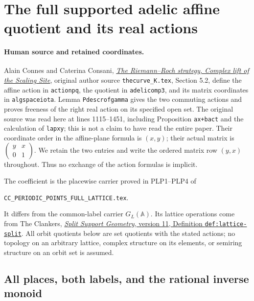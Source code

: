 \section{The full supported adelic affine quotient and its real actions}
\label{sec:supported-complex-lift}

\paragraph{Human source and retained coordinates.}
Alain Connes and Caterina Consani,
\href{https://arxiv.org/abs/1805.10501v1}{\emph{The Riemann--Roch strategy,
Complex lift of the Scaling Site}}, original author source \nolinkurl{thecurve_K.tex},
Section 5.2, define the affine action in \texttt{actionpq}, the
quotient in \texttt{adelicomp3}, and its matrix coordinates in
\texttt{algspaceiota}. Lemma \texttt{Pdescrofgamma} gives the two
commuting actions and proves freeness of the right real action on
its specified open set. The original source was read here at
lines 1115--1451, including Proposition \texttt{ax+bact} and the
calculation of \texttt{lapxy}; this is not a claim to have read the entire paper.
Their coordinate order in the affine-plane formula is $(x,y)$;
their actual matrix is $\left(\begin{smallmatrix}y&x\\0&1\end{smallmatrix}\right)$.
We retain the two entries and write the ordered matrix row $(y,x)$
throughout. Thus no exchange of the action formulas is implicit.

The coefficient is the placewise carrier proved in PLP1--PLP4 of
\begin{center}\small
\nolinkurl{CC_PERIODIC_POINTS_FULL_LATTICE.tex}.
\end{center}
It differs from the common-label carrier $G_L(\mathbb A)$.
Its lattice operations come
from The Clankers,
\href{https://github.com/KokunoYumeto/zeta-function-research-reader/blob/a2851f9eb352e7e4376bc629de86fa4ed9c1c434/workbenches/splitzero-tandem/foundations/split-support-geometry-v11/split_support_geometry_arithmetic_curve_v11.tex#L1226}
{\emph{Split Support Geometry}, version 11, Definition \texttt{def:lattice-split}}.
All orbit quotients below are set quotients with the stated actions;
no topology on an arbitrary lattice, complex structure on its
elements, or semiring structure on an orbit set is assumed.

\subsection{All places, both labels, and the rational inverse monoid}

